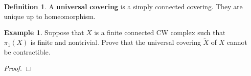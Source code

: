 \documentclass[a4paper]{article}
\theoremstyle{theorem}
\theoremstyle{definition}
\newtheorem{definition}{Definition} [section]
\newtheorem{example}{Example}
\theoremstyle{remark}
\theoremstyle{gremark}
\theoremstyle{discussion}
\theoremstyle{notation}
\begin{document}
	
\section*{}

\begin{definition}
	A \textbf{universal covering} is a simply connected covering. They are unique up to homeomorphism.
\end{definition}

\begin{example}
	Suppose that $X$ is a finite connected CW complex such that $\pi_1(X)$ is finite and nontrivial. Prove that the universal covering $\tilde{X}$ of $X$ cannot be contractible.
\end{example}

\begin{proof}
	
\end{proof}
	
	
\end{document}
